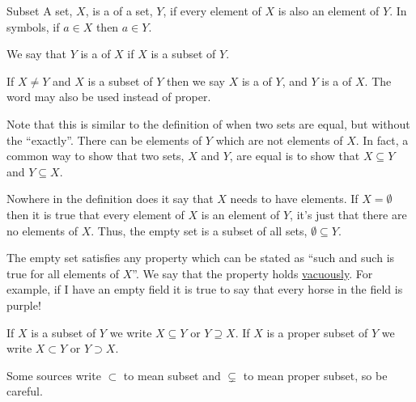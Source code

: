 \documentclass[fleqn]{LectureClass/LectureClass}
\begin{document}
    \begin{dfn}{Subset}{}
        A set, \(X\), is a  of a set, \(Y\), if every element of \(X\) is also an element of \(Y\).
        In symbols, if \(a \in X\) then \(a \in Y\).
        
        We say that \(Y\) is a  of \(X\) if \(X\) is a subset of \(Y\).
        
        If \(X \ne Y\) and \(X\) is a subset of \(Y\) then we say \(X\) is a  of \(Y\), and \(Y\) is a  of \(X\).
        The word  may also be used instead of proper.
    \end{dfn}
    
    Note that this is similar to the definition of when two sets are equal, but without the \enquote{exactly}.
    There can be elements of \(Y\) which are not elements of \(X\).
    In fact, a common way to show that two sets, \(X\) and \(Y\), are equal is to show that \(X \subseteq Y\) and \(Y \subseteq X\).
    
    Nowhere in the definition does it say that \(X\) needs to have elements.
    If \(X = \emptyset\) then it is true that every element of \(X\) is an element of \(Y\), it's just that there are no elements of \(X\).
    Thus, the empty set is a subset of all sets, \(\emptyset \subseteq Y\).
    
    \begin{remark}{}{}
        The empty set satisfies any property which can be stated as \enquote{such and such is true for all elements of \(X\)}.
        We say that the property holds \href{https://en.wikipedia.org/wiki/Vacuous_truth}{vacuously}.
        For example, if I have an empty field it is true to say that every horse in the field is purple!
    \end{remark}
    
    \begin{ntn}{}{}
        If \(X\) is a subset of \(Y\) we write \(X \subseteq Y\) or \(Y \supseteq X\).
        If \(X\) is a proper subset of \(Y\) we write \(X \subset Y\) or \(Y \supset X\).
        
        \begin{wrn}
            Some sources write \(\subset\) to mean subset and \(\subsetneq\) to mean proper subset, so be careful.
        \end{wrn}
    \end{ntn}
    
\end{document}
